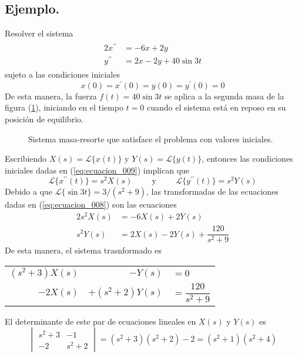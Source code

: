 \subsection*{Ejemplo.}
Resolver el sistema
\begin{eqnarray}
\begin{aligned}
2x^{\prime \prime} &=  - 6x + 2y \\
y^{\prime \prime} &= 2x - 2y + 40 \sin 3t
\end{aligned}
\label{eq:ecuacion_008}
\end{eqnarray}
sujeto a las condiciones iniciales
\begin{equation}
x(0) = x^{\prime} (0) = y(0) = y^{\prime} (0) = 0
\label{eq:ecuacion_009}
\end{equation}
De esta manera, la fuerza $f(t) = 40 \sin 3t$ se aplica a la segunda masa de la figura (\ref{fig:figura_005}), iniciando en el tiempo $t=0$ cuando el sistema está en reposo en su posición de equilibrio.
\begin{figure}[H]
\centering

\label{fig:figura_005}
\caption{Sistema masa-resorte que satisface el problema con valores iniciales.}
\end{figure}
Escribiendo $X(s) = \mathscr{L} \{ x(t) \}$ y $Y(s) = \mathscr{L} \{ y(t) \}$, entonces las condiciones iniciales dadas en (\ref{eq:ecuacion_009}) implican que
\[ \mathscr{L} \{ x^{\prime \prime} (t) \} = s^{2} X(s) \hspace{1cm} \mbox{y} \hspace{1cm} \mathscr{L} \{ y^{\prime \prime}(t) \} = s^{2} Y(s) \]
Debido a que $\mathscr{L} \{ \sin 3t \} = 3 / (s^{2} +9)$, las transformadas de las ecuaciones dadas en (\ref{eq:ecuacion_008}) son las ecuaciones
\begin{eqnarray*}
2 s^{2} X(s) &= - 6 X(s) + 2 Y(s) \nonumber \\
s^{2} Y(s) &= 2 X(s) - 2 Y(s) + \dfrac{120}{s^{2} + 9} \nonumber
\end{eqnarray*}
De esta manera, el sistema trasnformado es
\\
\begin{center}
\begin{tabular}{r r l}
$(s^{2} + 3) X(s)$ & $-Y(s)$ & $=0$ \\
$-2X(s)$ & $+(s^{2} + 2) Y(s)$ & $=\dfrac{120}{s^{2}+9}$ 
\end{tabular}
\end{center}
El determinante de este par de ecuaciones lineales en $X(s)$ y $Y(s)$ es
\[ \begin{vmatrix}
s^{2} + 3 & -1 \\
-2 & s^{2} + 2
\end{vmatrix} 
 = (s^{2} + 3)(s^{2} + 2) - 2 = (s^{2} + 1) (s^{2} + 4 )
\]

